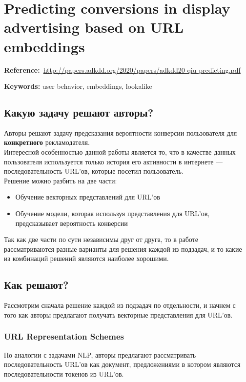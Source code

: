 \chapter{Predicting conversions in display advertising based on URL embeddings}

\textbf{Reference:}~\url{http://papers.adkdd.org/2020/papers/adkdd20-qiu-predicting.pdf}

\textbf{Keywords:} user behavior, embeddings, lookalike

\section*{Какую задачу решают авторы?}

Авторы решают задачу предсказания вероятности конверсии пользователя для \textbf{конкретного} рекламодателя. \\

Интересной особенностью данной работы является то, что в качестве данных пользователя используется только история его активности в интернете --- последовательность URL'ов, которые посетил пользователь. \\

Решение можно разбить на две части:
\begin{itemize}
    \item Обучение векторных представлений для URL'ов
    \item Обучение модели, которая используя представления для URL'ов, предсказывает вероятность конверсии
\end{itemize}

Так как две части по сути независимы друг от друга, то в работе рассматриваются разные варианты для решения каждой из подзадач, и то какие из комбинаций решений являются наиболее хорошими.

\section*{Как решают?}

Рассмотрим сначала решение каждой из подзадач по отдельности, и начнем с того как авторы предлагают получать векторные представления для URL'ов.

\subsection*{URL Representation Schemes}

По аналогии с задачами NLP, авторы предлагают рассматривать последовательность URL'ов как документ, предложениями в котором являются последовательности токенов из URL'ов.


